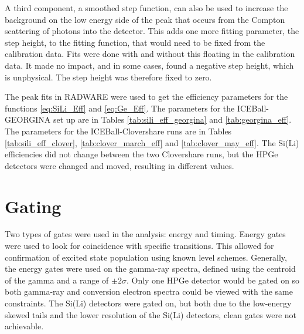 A third component, a smoothed step function, can also be used to increase the background on the low energy side of the peak that occurs from the Compton scattering of photons into the detector. This adds one more fitting parameter, the step height, to the fitting function, that would need to be fixed from the calibration data. Fits were done with and without this floating in the calibration data. It made no impact, and in some cases, found a negative step height, which is unphysical. The step height was therefore fixed to zero.

The peak fits in RADWARE were used to get the efficiency parameters for the functions \ref{eq:SiLi_Eff} and \ref{eq:Ge_Eff}. The parameters for the ICEBall-GEORGINA set up are in Tables \ref{tab:sili_eff_georgina} and \ref{tab:georgina_eff}. The parameters for the ICEBall-Clovershare runs are in Tables \ref{tab:sili_eff_clover}, \ref{tab:clover_march_eff} and \ref{tab:clover_may_eff}. The Si(Li) efficiencies did not change between the two Clovershare runs, but the HPGe detectors were changed and moved, resulting in different values.











\section{Gating}
\label{sec:gating}

Two types of gates were used in the analysis: energy and timing. Energy gates were used to look for coincidence with specific transitions. This allowed for confirmation of excited state population using known level schemes. Generally, the energy gates were used on the gamma-ray spectra, defined using the centroid of the gamma and a range of $\pm2\sigma$. Only one HPGe detector would be gated on so both gamma-ray and conversion electron spectra could be viewed with the same constraints. The Si(Li) detectors were gated on, but both due to the low-energy skewed tails and the lower resolution of the Si(Li) detectors, clean gates were not achievable.

